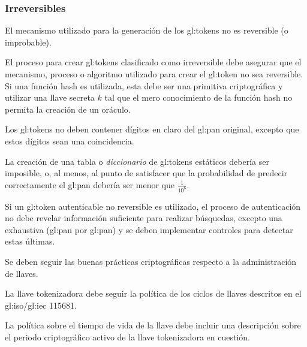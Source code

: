%
%

\subsubsection{Irreversibles}

{
  El mecanismo utilizado para la generación de los \glspl{gl:token}
  no es reversible (o improbable).

  {
    El proceso para crear \glspl{gl:token} clasificado como irreversible
    debe asegurar que el mecanismo, proceso o algoritmo utilizado para 
    crear el \gls{gl:token} no sea reversible. Si una función hash es 
    utilizada, esta debe ser una primitiva criptográfica y utilizar una 
    llave secreta $k$ tal que el mero conocimiento de la función hash 
    no permita la creación de un oráculo.
  }

  {
    Los \glspl{gl:token} no deben contener dígitos en claro del \gls{gl:pan}
    original, excepto que estos dígitos sean una coincidencia.
  }

  {
    La creación de una tabla o \textit{diccionario} de \glspl{gl:token}
    estáticos debería ser imposible, o, al menos, al punto de satisfacer
    que la probabilidad de predecir correctamente el \gls{gl:pan} debería ser 
    menor que $\frac{1}{10^6}$.
  }

  {
    Si un \gls{gl:token} autenticable no reversible es utilizado, el
    proceso de autenticación no debe revelar información suficiente para
    realizar búsquedas, excepto una exhaustiva (\gls{gl:pan} por 
    \gls{gl:pan}) y se deben implementar controles para detectar estas
    últimas.
  }
}

{
  Se deben seguir las buenas prácticas criptográficas respecto a la
  administración de llaves.
  
  {
    La llave tokenizadora debe seguir la política de los ciclos de llaves
    descritos en el \acrshort{gl:iso}/\acrshort{gl:iec} 115681.
  }

  {
    La política sobre el tiempo de vida de la llave debe incluir una 
    descripción sobre el periodo criptográfico activo de la llave 
    tokenizadora en cuestión.
  }

}